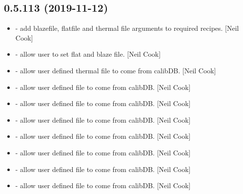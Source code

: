 \documentclass[a4paper,10pt,english]{report}
\begin{document}
\subsection{0.5.113 (2019-11-12)}
\label{\detokenize{misc/changelog:id30}}\begin{itemize}
\item {} 
 - add blazefile, flatfile
and thermal file arguments to required recipes. {[}Neil Cook{]}

\item {} 
 - allow user to set flat and blaze file.
{[}Neil Cook{]}

\item {} 
 - allow user defined thermal file to come from
calibDB. {[}Neil Cook{]}

\item {} 
 - allow user defined file to come from calibDB. {[}Neil
Cook{]}

\item {} 
 - allow user defined file to come from calibDB. {[}Neil
Cook{]}

\item {} 
 - allow user defined file to come from calibDB. {[}Neil
Cook{]}

\item {} 
 - allow user defined file to come from calibDB.
{[}Neil Cook{]}

\item {} 
 - allow user defined file to come from calibDB. {[}Neil
Cook{]}

\item {} 
 - allow user defined file to come from calibDB. {[}Neil
Cook{]}

\item {} 
 - allow user defined file to come from calibDB.
{[}Neil Cook{]}

\end{itemize}
\end{document}
